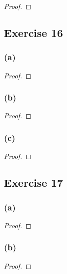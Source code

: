 \documentclass[14pt]{extarticle}
\begin{document}
\begin{proof}

\end{proof}

\subsection{Exercise 16}

\subsubsection{(a)}

\begin{proof}

\end{proof}

\subsubsection{(b)}

\begin{proof}

\end{proof}

\subsubsection{(c)}

\begin{proof}

\end{proof}

\subsection{Exercise 17}

\subsubsection{(a)}

\begin{proof}

\end{proof}

\subsubsection{(b)}

\begin{proof}

\end{proof}
\end{document}
